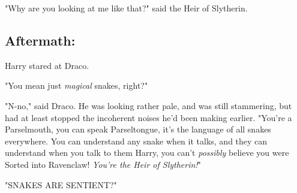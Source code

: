 {\el}

{\el}

{\el}

{\el}

"Why are you looking at me like that?" said the Heir of Slytherin.
\sbreak
\subsection{Aftermath:}

Harry stared at Draco.

"You mean just \emph{magical} snakes, right?"

"N-no," said Draco. He was looking rather pale, and was still stammering, but
had at least stopped the incoherent noises he'd been making earlier. "You're a
Parselmouth, you can speak Parseltongue, it's the language of all snakes
everywhere. You can understand any snake when it talks, and they can understand
when you talk to them{\el} Harry, you can't \emph{possibly} believe you were
Sorted into Ravenclaw! \emph{You're the Heir of Slytherin!}"

{\el}

{\el}

{\el}

{\el}

{\el}

"SNAKES ARE SENTIENT?"
